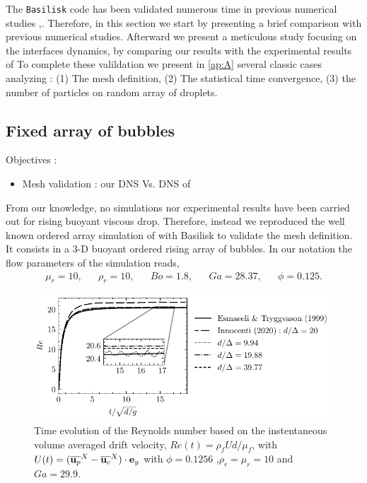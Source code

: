 

The \texttt{Basilisk} code has been validated numerous time in previous numerical studies \citet{innocenti2020direct},\citet{popinet2018numerical}. 
Therefore,  in this section we start by presenting a brief comparison with previous numerical studies. 
Afterward we present a meticulous study focusing on the interfaces dynamics, by comparing our results with the experimental results of \citet{mohamed2003drop} 
To complete these valildation we present in \ref{ap:A} several classic cases analyzing :
(1) The mesh definition, (2) The statistical time convergence, (3) the number of particles on random array of droplets. 
 
\subsection{Fixed array of bubbles}
Objectives :
\begin{itemize}
    \item Mesh validation : our DNS Vs. DNS of \cite{esmaeeli1999direct}
\end{itemize}
From our knowledge, no simulations nor experimental results have been carried out for rising buoyant viscous drop. 
Therefore, instead we reproduced the well known ordered array simulation of \citet{esmaeeli1999direct} with Basilisk to validate the mesh definition.  
It consists in a 3-D buoyant ordered rising array of bubbles. 
In our notation the flow parameters of the simulation reads, 
\begin{align*}
    \mu_r = 10,
    && \rho_r = 10,
    && Bo = 1.8,
    && Ga = 28.37,
    && \phi = 0.125.
\end{align*}
\begin{figure}[h!]
    \centering
    \includegraphics[height = 0.35\textwidth]{image/VALIDATION2.0/Loisy/Re.pdf}
    \caption{Time evolution of the Reynolds number based on the instentaneous volume averaged drift velocity, $Re(t) = \rho_fU d /\mu_f$, with $U(t) = (\overline{\textbf{u}_p}^X - \overline{\textbf{u}_c}^X)\cdot \textbf{e}_y$ with $\phi = 0.1256$ ,$\rho_r =\mu_r =10$ and $Ga = 29.9$.}
    \label{fig:ordered_array}
\end{figure}
